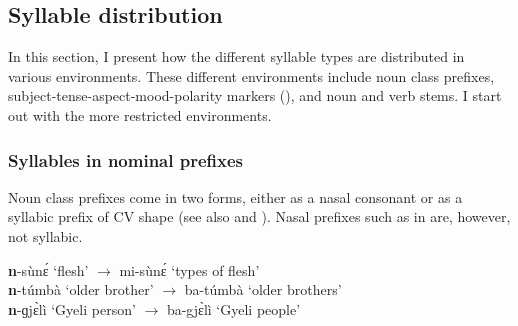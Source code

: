 




\subsection{Syllable distribution}
\label{sec:SyllDist}

In this section, I present how the different syllable types are distributed in various environments. These different environments include noun class prefixes, subject-tense-aspect-mood-polarity markers (), and noun and verb stems. I start out with the more restricted environments.

\subsubsection{Syllables in nominal prefixes}
\label{sec:SyllPre}

Noun class prefixes come in two forms, either as a nasal consonant or as a syllabic prefix of CV shape (see also  and ). Nasal prefixes such as in  are, however, not syllabic.

\ea \label{noPre}
{\bfseries n}-sùnɛ́ `flesh' $\rightarrow$ mi-sùnɛ́ `types of flesh' \\
{\bfseries n}-túmbà `older brother' $\rightarrow$ ba-túmbà `older brothers' \\
{\bfseries n}-ɡjɛ̀lì `Gyeli person' $\rightarrow$ ba-gjɛ̀lì `Gyeli people'
\z


